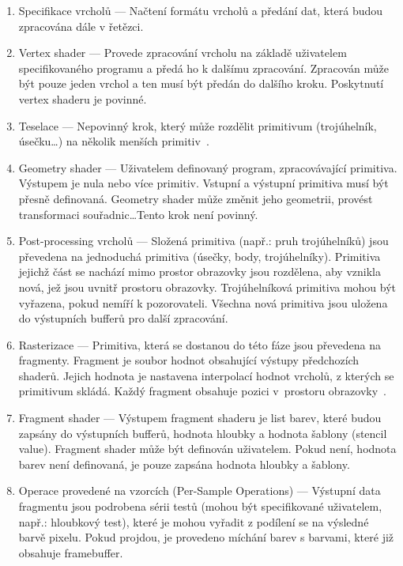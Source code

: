 \documentclass[thesis=M,czech]{FITthesis}[2019/12/23]
\begin{document}
\begin{enumerate}
\item Specifikace vrcholů --- Načtení formátu vrcholů a předání dat, která budou zpracována dále v řetězci. 

\item Vertex shader --- Provede zpracování vrcholu na základě uživatelem specifikovaného programu a předá ho k dalšímu zpracování. Zpracován může být pouze jeden vrchol a ten musí být předán do dalšího kroku. Poskytnutí vertex shaderu je povinné.

\item Teselace --- Nepovinný krok, který může rozdělit primitivum (trojúhelník, úsečku\dots) na několik menších primitiv~\cite{kronos_tess}.

\item Geometry shader --- Uživatelem definovaný program, zpracovávající primitiva. Výstupem je nula nebo více primitiv. Vstupní a výstupní primitiva musí být přesně definovaná. Geometry shader může změnit jeho geometrii, provést transformaci souřadnic\dots Tento krok není povinný.

\item Post-processing vrcholů --- Složená primitiva (např.: pruh trojúhelníků) jsou převedena na jednoduchá primitiva (úsečky, body, trojúhelníky). Primitiva jejichž část se nachází mimo prostor obrazovky jsou rozdělena, aby vznikla nová, jež jsou uvnitř prostoru obrazovky. Trojúhelníková primitiva mohou být vyřazena, pokud nemíří k pozorovateli. Všechna nová primitiva jsou uložena do výstupních bufferů pro další zpracování.

\item Rasterizace --- Primitiva, která se dostanou do této fáze jsou převedena na fragmenty. Fragment je soubor hodnot obsahující výstupy předchozích shaderů. Jejich hodnota je nastavena interpolací hodnot vrcholů, z kterých se primitivum skládá. Každý fragment obsahuje pozici v~prostoru obrazovky~\cite{kronos_frag}.

\item Fragment shader --- Výstupem fragment shaderu je list barev, které budou zapsány do výstupních bufferů, hodnota hloubky a hodnota šablony (stencil value). Fragment shader může být definován uživatelem. Pokud není, hodnota barev není definovaná, je pouze zapsána hodnota hloubky a šablony.

\item Operace provedené na vzorcích (Per-Sample Operations) --- Výstupní data fragmentu jsou podrobena sérii testů (mohou být specifikované uživatelem, např.: hloubkový test), které je mohou vyřadit z podílení se na výsledné barvě pixelu. Pokud projdou, je provedeno míchání barev s barvami, které již obsahuje framebuffer.
\end{enumerate}
\end{document}
